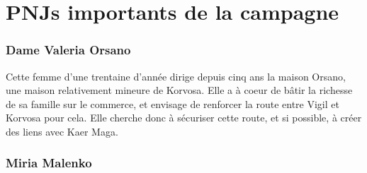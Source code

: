 \documentclass[letterpaper,10pt,twoside,twocolumn,openany]{book}
\begin{document}
\chapter{PNJs importants de la campagne}
\subsection{Dame Valeria Orsano}
Cette femme d'une trentaine d'année dirige depuis cinq ans la maison Orsano, une maison relativement mineure de Korvosa. Elle a à coeur de bâtir la richesse de sa famille sur le commerce, et envisage de renforcer la route entre Vigil et Korvosa pour cela. Elle cherche donc à sécuriser cette route, et si possible, à créer des liens avec Kaer Maga.
\subsection{Miria Malenko}
\end{document}
